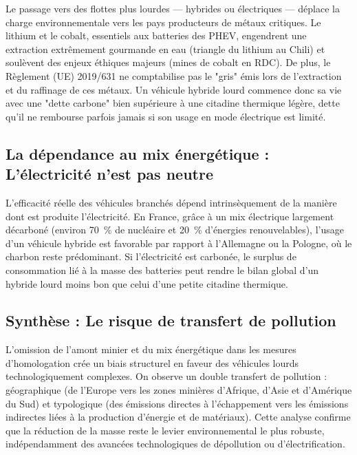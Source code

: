 \documentclass[12pt, a4paper]{article}
\begin{document}
Le passage vers des flottes plus lourdes --- hybrides ou électriques --- déplace la charge environnementale vers les pays producteurs de métaux critiques. Le lithium et le cobalt, essentiels aux batteries des PHEV, engendrent une extraction extrêmement gourmande en eau (triangle du lithium au Chili) et soulèvent des enjeux éthiques majeurs (mines de cobalt en RDC). De plus, le Règlement (UE) 2019/631 ne comptabilise pas le  "gris" émis lors de l'extraction et du raffinage de ces métaux. Un véhicule hybride lourd commence donc sa vie avec une "dette carbone" bien supérieure à une citadine thermique légère, dette qu'il ne rembourse parfois jamais si son usage en mode électrique est limité.

\subsection{La dépendance au mix énergétique : L'électricité n'est pas neutre}

L'efficacité réelle des véhicules branchés dépend intrinsèquement de la manière dont est produite l'électricité. En France, grâce à un mix électrique largement décarboné (environ \SI{70}{\percent} de nucléaire et \SI{20}{\percent} d'énergies renouvelables), l'usage d'un véhicule hybride est favorable par rapport à l'Allemagne ou la Pologne, où le charbon reste prédominant. Si l'électricité est carbonée, le surplus de consommation lié à la masse des batteries peut rendre le bilan global d'un hybride lourd moins bon que celui d'une petite citadine thermique.

\subsection{Synthèse : Le risque de transfert de pollution}

L'omission de l'amont minier et du mix énergétique dans les mesures d'homologation crée un biais structurel en faveur des véhicules lourds technologiquement complexes. On observe un double transfert de pollution : géographique (de l'Europe vers les zones minières d'Afrique, d'Asie et d'Amérique du Sud) et typologique (des émissions directes à l'échappement vers les émissions indirectes liées à la production d'énergie et de matériaux). Cette analyse confirme que la réduction de la masse reste le levier environnemental le plus robuste, indépendamment des avancées technologiques de dépollution ou d'électrification.

\end{document}
